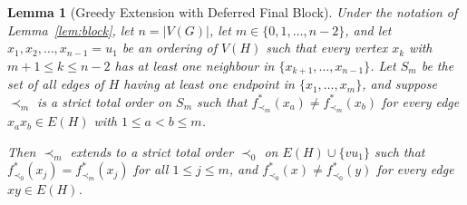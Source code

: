 \documentclass[11pt,a4paper]{article}
\newtheorem{lemma}[theorem]{Lemma}
\begin{document}
\begin{lemma}[Greedy Extension with Deferred Final Block]
\label{lem:greedy}
Under the notation of Lemma~\ref{lem:block}, let $n = |V(G)|$, let $m \in \{0, 1, \dots, n - 2\}$, and let $x_1, x_2, \dots, x_{n-1} = u_1$ be an ordering of $V(H)$ such that every vertex $x_k$ with $m + 1 \le k \le n - 2$ has at least one neighbour in $\{x_{k+1}, \dots, x_{n-1}\}$. Let $S_m$ be the set of all edges of $H$ having at least one endpoint in $\{x_1, \dots, x_m\}$, and suppose $\prec_m$ is a strict total order on $S_m$ such that $f^*_{\prec_m}(x_a) \neq f^*_{\prec_m}(x_b)$ for every edge $x_a x_b \in E(H)$ with $1 \le a < b \le m$.

Then $\prec_m$ extends to a strict total order $\prec_0$ on $E(H) \cup \{v u_1\}$ such that $f^*_{\prec_0}(x_j) = f^*_{\prec_m}(x_j)$ for all $1 \le j \le m$, and $f^*_{\prec_0}(x) \neq f^*_{\prec_0}(y)$ for every edge $xy \in E(H)$.
\end{lemma}
\end{document}
